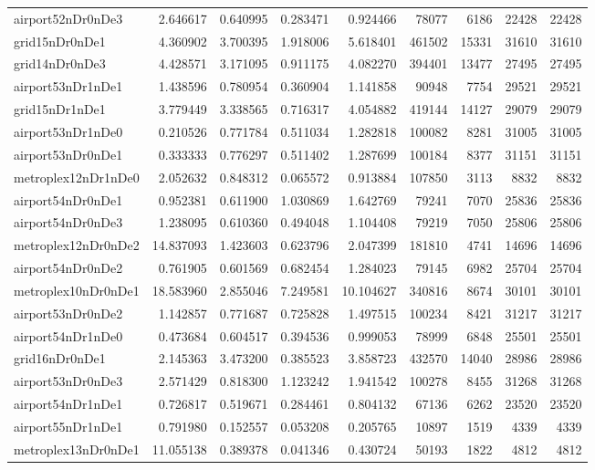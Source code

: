 \begin{longtable}{|l|r|r|r|r|r|r|r|r|}
airport52nDr0nDe3 & 2.646617 & 0.640995 & 0.283471 & 0.924466 & 78077 & 6186 & 22428 & 22428 \\
grid15nDr0nDe1 & 4.360902 & 3.700395 & 1.918006 & 5.618401 & 461502 & 15331 & 31610 & 31610 \\
grid14nDr0nDe3 & 4.428571 & 3.171095 & 0.911175 & 4.082270 & 394401 & 13477 & 27495 & 27495 \\
airport53nDr1nDe1 & 1.438596 & 0.780954 & 0.360904 & 1.141858 & 90948 & 7754 & 29521 & 29521 \\
grid15nDr1nDe1 & 3.779449 & 3.338565 & 0.716317 & 4.054882 & 419144 & 14127 & 29079 & 29079 \\
airport53nDr1nDe0 & 0.210526 & 0.771784 & 0.511034 & 1.282818 & 100082 & 8281 & 31005 & 31005 \\
airport53nDr0nDe1 & 0.333333 & 0.776297 & 0.511402 & 1.287699 & 100184 & 8377 & 31151 & 31151 \\
metroplex12nDr1nDe0 & 2.052632 & 0.848312 & 0.065572 & 0.913884 & 107850 & 3113 & 8832 & 8832 \\
airport54nDr0nDe1 & 0.952381 & 0.611900 & 1.030869 & 1.642769 & 79241 & 7070 & 25836 & 25836 \\
airport54nDr0nDe3 & 1.238095 & 0.610360 & 0.494048 & 1.104408 & 79219 & 7050 & 25806 & 25806 \\
metroplex12nDr0nDe2 & 14.837093 & 1.423603 & 0.623796 & 2.047399 & 181810 & 4741 & 14696 & 14696 \\
airport54nDr0nDe2 & 0.761905 & 0.601569 & 0.682454 & 1.284023 & 79145 & 6982 & 25704 & 25704 \\
metroplex10nDr0nDe1 & 18.583960 & 2.855046 & 7.249581 & 10.104627 & 340816 & 8674 & 30101 & 30101 \\
airport53nDr0nDe2 & 1.142857 & 0.771687 & 0.725828 & 1.497515 & 100234 & 8421 & 31217 & 31217 \\
airport54nDr1nDe0 & 0.473684 & 0.604517 & 0.394536 & 0.999053 & 78999 & 6848 & 25501 & 25501 \\
grid16nDr0nDe1 & 2.145363 & 3.473200 & 0.385523 & 3.858723 & 432570 & 14040 & 28986 & 28986 \\
airport53nDr0nDe3 & 2.571429 & 0.818300 & 1.123242 & 1.941542 & 100278 & 8455 & 31268 & 31268 \\
airport54nDr1nDe1 & 0.726817 & 0.519671 & 0.284461 & 0.804132 & 67136 & 6262 & 23520 & 23520 \\
airport55nDr1nDe1 & 0.791980 & 0.152557 & 0.053208 & 0.205765 & 10897 & 1519 & 4339 & 4339 \\
metroplex13nDr0nDe1 & 11.055138 & 0.389378 & 0.041346 & 0.430724 & 50193 & 1822 & 4812 & 4812 \\

\end{longtable}
